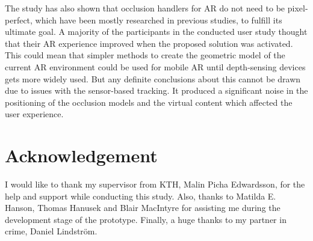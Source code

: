 The study has also shown that occlusion handlers for AR do not need to be pixel-perfect, which have been mostly researched in previous studies, to fulfill its ultimate goal. A majority of the participants in the conducted user study thought that their AR experience improved when the proposed solution was activated. This could mean that simpler methods to create the geometric model of the current AR environment could be used for mobile AR until depth-sensing devices gets more widely used. But any definite conclusions about this cannot be drawn due to issues with the sensor-based tracking. It produced a significant noise in the positioning of the occlusion models and the virtual content which affected the user experience.

\section{Acknowledgement}
I would like to thank my supervisor from KTH, Malin Picha Edwardsson, for the help and support while conducting this study. Also, thanks to Matilda E. Hanson, Thomas Hanusek and Blair MacIntyre for assisting me during the development stage of the prototype. Finally, a huge thanks to my partner in crime, Daniel Lindstr\"om.



